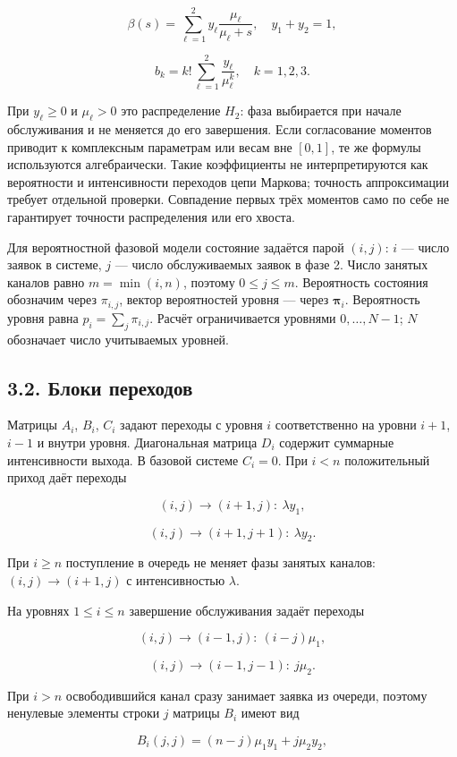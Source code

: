 \[\beta(s)=\sum_{\ell=1}^{2}y_\ell\frac{\mu_\ell}{\mu_\ell+s},\quad
y_1+y_2=1,\]

\[b_k=k!\sum_{\ell=1}^{2}\frac{y_\ell}{\mu_\ell^k},\quad k=1,2,3.\]


При \(y_\ell\ge0\) и \(\mu_\ell>0\) это распределение \(H_2\): фаза выбирается при начале обслуживания и не меняется до его завершения. Если согласование моментов приводит к комплексным параметрам или весам вне \([0,1]\), те же формулы используются алгебраически. Такие коэффициенты не интерпретируются как вероятности и интенсивности переходов цепи Маркова; точность аппроксимации требует отдельной проверки. Совпадение первых трёх моментов само по себе не гарантирует точности распределения или его хвоста.

Для вероятностной фазовой модели состояние задаётся парой \((i,j)\): \(i\) --- число заявок в системе, \(j\) --- число обслуживаемых заявок в фазе 2. Число занятых каналов равно \(m=\min(i,n)\), поэтому \(0\le j\le m.\) Вероятность состояния обозначим через \(\pi_{i,j}\), вектор вероятностей уровня --- через \(\boldsymbol\pi_i.\) Вероятность уровня равна \(p_i=\sum_j\pi_{i,j}.\) Расчёт ограничивается уровнями \(0,\ldots,N-1\); \(N\) обозначает число учитываемых уровней.

\subsection*{3.2. Блоки переходов}
Матрицы \(A_i\), \(B_i\), \(C_i\) задают переходы с уровня \(i\) соответственно на уровни \(i+1\), \(i-1\) и внутри уровня. Диагональная матрица \(D_i\) содержит суммарные интенсивности выхода. В базовой системе \(C_i=0.\) При \(i<n\) положительный приход даёт переходы


\[(i,j)\to(i+1,j):\ \lambda y_1,\]

\[(i,j)\to(i+1,j+1):\ \lambda y_2.\]


При \(i\ge n\) поступление в очередь не меняет фазы занятых каналов: \((i,j)\to(i+1,j)\) с интенсивностью \(\lambda.\)

На уровнях \(1\le i\le n\) завершение обслуживания задаёт переходы


\[(i,j)\to(i-1,j):\ (i-j)\mu_1,\]

\[(i,j)\to(i-1,j-1):\ j\mu_2.\]


При \(i>n\) освободившийся канал сразу занимает заявка из очереди, поэтому ненулевые элементы строки \(j\) матрицы \(B_i\) имеют вид


\[B_i(j,j)=(n-j)\mu_1y_1+j\mu_2y_2,\]

